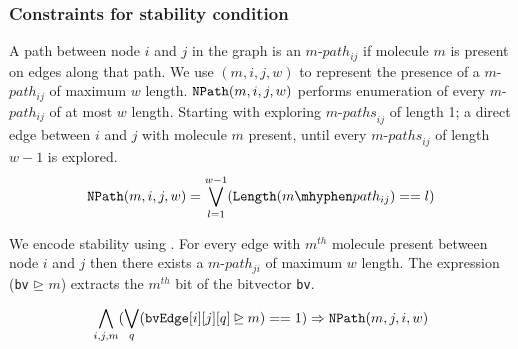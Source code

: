 \subsubsection{Constraints for stability condition}
%
A path between node $i$ and $j$ in the graph is an $m$-$path_{ij}$ if molecule $m$ is present on edges along that path.
%
%
We use {\npath}$(m, i, j, w)$ to represent the presence of a $m$-$path_{ij}$ of maximum $w$ length.
%
%
$\texttt{NPath}(m, i, j, w)$ performs enumeration of every $m$-$path_{ij}$ of at most $w$ length. 
%
Starting with exploring $m$-${paths}_{ij}$ of length 1; a direct edge between $i$ and $j$ with molecule $m$ present, until every $m$-${paths}_{ij}$ of length $w-1$ is explored.
%
%
\begin{align*}
\npath(m, i, j, w) = \bigvee\limits_{l = 1}^{w-1} (\texttt{Length} (m \mhyphen path_{ij}) == l)
\end{align*}

We encode stability using \npath. For every edge with $m^{th}$ molecule present between node $i$ and $j$ then there exists a $m$-$path_{ji}$ of maximum $w$ length.
%
The expression (\texttt{bv} $\unrhd$ $m$) extracts the $m^{th}$ bit of the bitvector \texttt{bv}. 

\begin{align*}
	\bigwedge\limits_{i,j,m} (\bigvee_{q} (\texttt{bvEdge}[i][j][q] \unrhd m) == 1) \Rightarrow \texttt{NPath}(m, j, i, w)
\end{align*}

